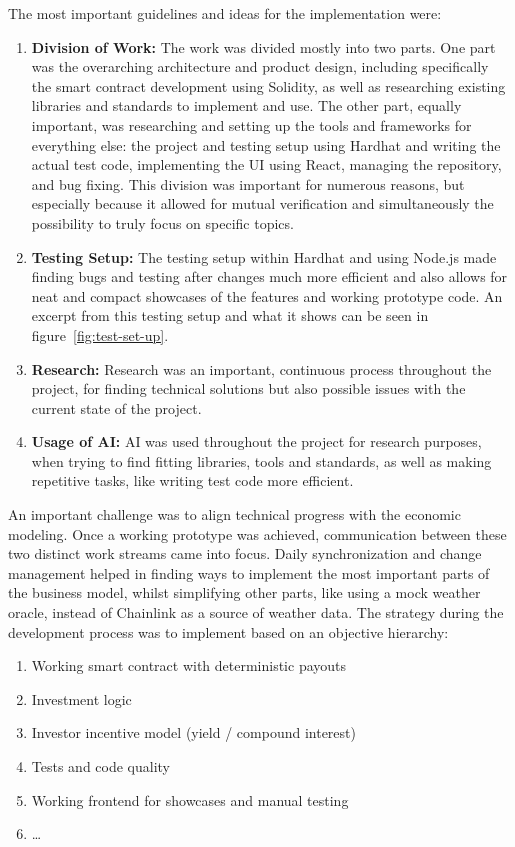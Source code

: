 \documentclass[11pt,a4paper]{article}
\begin{document}
		The most important guidelines and ideas for the implementation were:

		\begin{enumerate}[1]
			\item \textbf{Division of Work:} The work was divided mostly into two parts.
				One part was the overarching architecture and product design, including specifically the smart contract development using Solidity, as well as researching existing libraries and standards to implement and use.
				The other part, equally important, was researching and setting up the tools and frameworks for everything else: the project and testing setup using Hardhat and writing the actual test code, implementing the UI using React, managing the repository, and bug fixing.
				This division was important for numerous reasons, but especially because it allowed for mutual verification and simultaneously the possibility to truly focus on specific topics.
			\item \textbf{Testing Setup:} The testing setup within Hardhat and using Node.js made finding bugs and testing after changes much more efficient and also allows for neat and compact showcases of the features and working prototype code.
				An excerpt from this testing setup and what it shows can be seen in figure~\ref{fig:test-set-up}.
			\item \textbf{Research:} Research was an important, continuous process throughout the project, for finding technical solutions but also possible issues with the current state of the project.
			\item \textbf{Usage of AI:} AI was used throughout the project for research purposes, when trying to find fitting libraries, tools and standards, as well as making repetitive tasks, like writing test code more efficient.
		\end{enumerate}

		An important challenge was to align technical progress with the economic modeling.
		Once a working prototype was achieved, communication between these two distinct work streams came into focus.
		Daily synchronization and change management helped in finding ways to implement the most important parts of the business model, whilst simplifying other parts, like using a mock weather oracle, instead of Chainlink as a source of weather data.
		The strategy during the development process was to implement based on an objective hierarchy:

		\begin{enumerate}[1]
			\item Working smart contract with deterministic payouts
			\item Investment logic
			\item Investor incentive model (yield / compound interest)
			\item Tests and code quality
			\item Working frontend for showcases and manual testing
			\item \ldots
		\end{enumerate}
\end{document}
